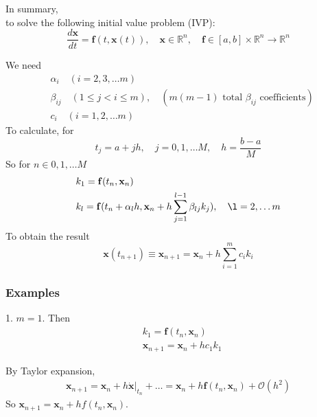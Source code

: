 \documentclass[10pt]{amsart}
\begin{document}
\begin{multicols*}{2}
In summary, \\
to solve the following initial value problem (IVP):
\begin{equation}
\boxed{
\frac{d\mathbf{x}}{dt} = \mathbf{f}(t, \mathbf{x}(t)), \quad \mathbf{x} \in \mathbb{R}^n, \quad \mathbf{f} \in [a, b] \times \mathbb{R}^n \to \mathbb{R}^n
}
\end{equation}

We need
\begin{equation}
\begin{aligned}
& \alpha_i \quad (i = 2, 3, \dots m) \\
& \beta_{ij} \quad (1 \leq j < i \leq m) , \quad (m(m-1) \text{ total $\beta_{ij}$ coefficients}) \\
& c_i  \quad (i = 1, 2, \dots m)	
\end{aligned}
\end{equation}
To calculate, for 
\begin{equation}
	\boxed{
		t_j = a+jh, \quad j=0, 1, \dots M, \quad h = \frac{b-a}{M} }
\end{equation}
So for $n \in 0 ,1 ,\dots M$
\begin{equation}
	\begin{aligned}
& 	k_1 = \mathbf{f}(t_n, \mathbf{x}_n) \\
& k_l = \mathbf{f}(t_n + \alpha_l h, \mathbf{x}_n + h \sum_{j=1}^{l-1} \beta_{lj} k_j) , \quad \l = 2, \dots m
	\end{aligned}	
\end{equation}
To obtain the result
\begin{equation}
	\mathbf{x}(t_{n+1}) \equiv \mathbf{x}_{n+1} = \mathbf{x}_{n} + h \sum_{i=1}^m c_i k_i
\end{equation}

\subsubsection{Examples}

1. $m = 1$. Then 
\[
\begin{aligned}
	& k_1 = \mathbf{f}(t_n, \mathbf{x}_n) \\
	& \mathbf{x}_{n+1} = \mathbf{x}_n + hc_1 k_1
\end{aligned}
\]

By Taylor expansion,
\[
\begin{gathered}
	\mathbf{x}_{n+1} = \mathbf{x}_n + h \left. \dot{\mathbf{x}} \right|_{t_n} + \dots = \mathbf{x}_n + h \mathbf{f}(t_n, \mathbf{x}_n) + \mathcal{O}(h^2)
\end{gathered}
\]
So $\mathbf{x}_{n+1} = \mathbf{x}_n + h f(t_n, \mathbf{x}_n)$.  \\


\end{multicols*}
\end{document}
